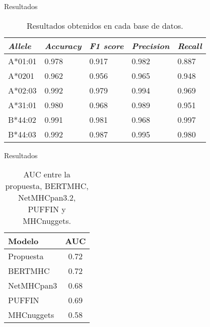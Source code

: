 \documentclass[10pt]{beamer}
\newcommand{\1}{
	\setbeamertemplate{background}{
		\texttt{[image: img/1]}
		\tikz[overlay] \fill[fill opacity=0.75,fill=white] (0,0) rectangle (-\paperwidth,\paperheight);
	}
}
\begin{document}
\begin{frame}{Resultados}{}
\begin{table}[]
	\centering
	\caption{Resultados obtenidos en cada base de datos. }
	\label{tab:results}
	\setlength{\tabcolsep}{0.8em} %
	{\renewcommand{\arraystretch}{1.3}%
		\begin{tabular}{lllll}
			\hline
			\textit{\textbf{Allele}} & \textit{\textbf{Accuracy}} & \textit{\textbf{F1 score}} & \textit{\textbf{Precision}} & \textit{\textbf{Recall}} \\
			\hline
			A*01:01                  & 0.978                      & 0.917                      & 0.982                       & 0.887                    \\
			A*0201                   & 0.962                      & 0.956                      & 0.965                       & 0.948                    \\
			A*02:03                  & 0.992                      & 0.979                      & 0.994                       & 0.969                    \\
			A*31:01                  & 0.980                      & 0.968                      & 0.989                       & 0.951                    \\
			B*44:02                  & 0.991                      & 0.981                      & 0.968                       & 0.997                    \\
			B*44:03                  & 0.992                      & 0.987                      & 0.995                       & 0.980                   
		\end{tabular}
	}
\end{table}
\end{frame}

\begin{frame}{Resultados}{}
	\begin{table}[h]
		\centering
		\caption{AUC entre la propuesta, BERTMHC, NetMHCpan3.2, PUFFIN y MHCnuggets.}
		\setlength{\tabcolsep}{0.8em} %
		{\renewcommand{\arraystretch}{1.3}%
			\begin{tabular}{lc}
				\hline
				\textbf{Modelo} & \textbf{AUC} \\ \hline
				Propuesta & 0.72\\
				BERTMHC & 0.72\\
				NetMHCpan3 & 0.68\\
				PUFFIN & 0.69\\
				MHCnuggets & 0.58\\
			\end{tabular}
		}
	\end{table}
\end{frame}
\end{document}
